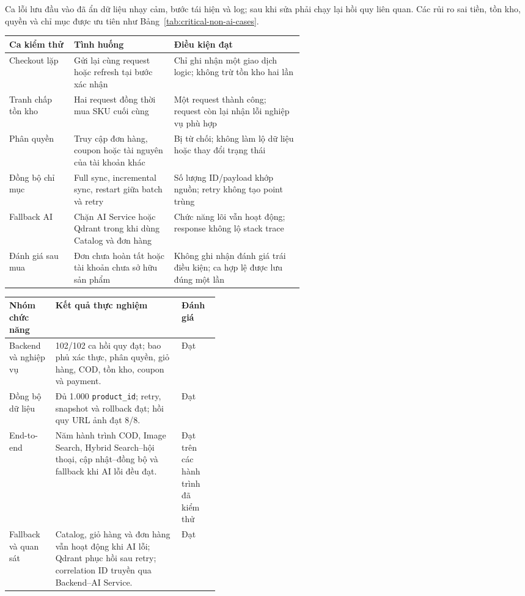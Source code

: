 Ca lỗi lưu đầu vào đã ẩn dữ liệu nhạy cảm, bước tái hiện và log; sau khi sửa phải chạy lại hồi quy liên quan. Các rủi ro sai tiền, tồn kho, quyền và chỉ mục được ưu tiên như Bảng~\ref{tab:critical-non-ai-cases}.

\begin{breakabletable}
\centering
\caption{Các ca kiểm thử nghiệp vụ trọng yếu}
\label{tab:critical-non-ai-cases}
\small
\begin{tabularx}{\linewidth}{|p{0.22\linewidth}|p{0.34\linewidth}|X|}
\hline
\textbf{Ca kiểm thử} & \textbf{Tình huống} & \textbf{Điều kiện đạt} \\ \hline
Checkout lặp & Gửi lại cùng request hoặc refresh tại bước xác nhận & Chỉ ghi nhận một giao dịch logic; không trừ tồn kho hai lần \\ \hline
Tranh chấp tồn kho & Hai request đồng thời mua SKU cuối cùng & Một request thành công; request còn lại nhận lỗi nghiệp vụ phù hợp \\ \hline
Phân quyền & Truy cập đơn hàng, coupon hoặc tài nguyên của tài khoản khác & Bị từ chối; không làm lộ dữ liệu hoặc thay đổi trạng thái \\ \hline
Đồng bộ chỉ mục & Full sync, incremental sync, restart giữa batch và retry & Số lượng ID/payload khớp nguồn; retry không tạo point trùng \\ \hline
Fallback AI & Chặn AI Service hoặc Qdrant trong khi dùng Catalog và đơn hàng & Chức năng lõi vẫn hoạt động; response không lộ stack trace \\ \hline
Đánh giá sau mua & Đơn chưa hoàn tất hoặc tài khoản chưa sở hữu sản phẩm & Không ghi nhận đánh giá trái điều kiện; ca hợp lệ được lưu đúng một lần \\ \hline
\end{tabularx}
\end{breakabletable}

\begin{breakabletable}
\centering
\caption{Kết quả kiểm thử chức năng ngoài AI Service}
\label{tab:non-ai-results-summary}
\small
\begin{tabularx}{\linewidth}{|p{0.22\linewidth}|X|p{0.18\linewidth}|}
\hline
\textbf{Nhóm chức năng} & \textbf{Kết quả thực nghiệm} & \textbf{Đánh giá} \\ \hline
Backend và nghiệp vụ & 102/102 ca hồi quy đạt; bao phủ xác thực, phân quyền, giỏ hàng, COD, tồn kho, coupon và payment. & Đạt \\ \hline
Đồng bộ dữ liệu & Đủ 1.000 \texttt{product\_id}; retry, snapshot và rollback đạt; hồi quy URL ảnh đạt 8/8. & Đạt \\ \hline
End-to-end & Năm hành trình COD, Image Search, Hybrid Search--hội thoại, cập nhật--đồng bộ và fallback khi AI lỗi đều đạt. & Đạt trên các hành trình đã kiểm thử \\ \hline
Fallback và quan sát & Catalog, giỏ hàng và đơn hàng vẫn hoạt động khi AI lỗi; Qdrant phục hồi sau retry; correlation ID truyền qua Backend--AI Service. & Đạt \\ \hline
\end{tabularx}
\end{breakabletable}

